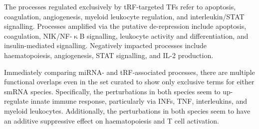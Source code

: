 The processes regulated exclusively by tRF-targeted TFs refer to apoptosis, coagulation, angiogenesis, myeloid leukocyte regulation, and interleukin/STAT signalling. Processes amplified via the putative de-repression include apoptosis, coagulation, NIK/NF-$\upkappa$B signalling, leukocyte activity and differentiation, and insulin-mediated signalling. Negatively impacted processes include haematopoiesis, angiogenesis, STAT signalling, and IL-2 production.

Immediately comparing miRNA- and tRF-associated processes, there are multiple functional overlaps even in the set curated to show only exclusive terms for either smRNA species. Specifically, the perturbations in both species seem to up-regulate innate immune response, particularly via INFs, TNF, interleukins, and myeloid leukocytes. Additionally, the perturbations in both species seem to have an additive suppressive effect on haematopoiesis and T cell activation.

\newpage
